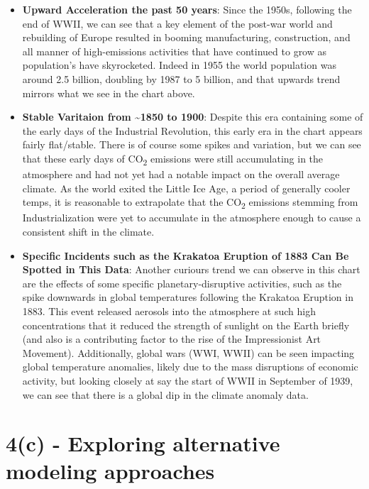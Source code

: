 \documentclass[
  letterpaper,
  DIV=11,
  numbers=noendperiod]{scrartcl}
\begin{document}
\begin{itemize}
\item
  \textbf{Upward Acceleration the past 50 years}: Since the 1950s,
  following the end of WWII, we can see that a key element of the
  post-war world and rebuilding of Europe resulted in booming
  manufacturing, construction, and all manner of high-emissions
  activities that have continued to grow as population's have
  skyrocketed. Indeed in 1955 the world population was around 2.5
  billion, doubling by 1987 to 5 billion, and that upwards trend mirrors
  what we see in the chart above.
\item
  \textbf{Stable Varitaion from \textasciitilde1850 to 1900}: Despite
  this era containing some of the early days of the Industrial
  Revolution, this early era in the chart appears fairly flat/stable.
  There is of course some spikes and variation, but we can see that
  these early days of CO\textsubscript{2} emissions were still
  accumulating in the atmosphere and had not yet had a notable impact on
  the overall average climate. As the world exited the Little Ice Age, a
  period of generally cooler temps, it is reasonable to extrapolate that
  the CO\textsubscript{2} emissions stemming from Industrialization were
  yet to accumulate in the atmosphere enough to cause a consistent shift
  in the climate.
\item
  \textbf{Specific Incidents such as the Krakatoa Eruption of 1883 Can
  Be Spotted in This Data}: Another curiours trend we can observe in
  this chart are the effects of some specific planetary-disruptive
  activities, such as the spike downwards in global temperatures
  following the Krakatoa Eruption in 1883. This event released aerosols
  into the atmosphere at such high concentrations that it reduced the
  strength of sunlight on the Earth briefly (and also is a contributing
  factor to the rise of the Impressionist Art Movement). Additionally,
  global wars (WWI, WWII) can be seen impacting global temperature
  anomalies, likely due to the mass disruptions of economic activity,
  but looking closely at say the start of WWII in September of 1939, we
  can see that there is a global dip in the climate anomaly data.
\end{itemize}

\section{4(c) - Exploring alternative modeling
approaches}\label{c---exploring-alternative-modeling-approaches}
\end{document}
